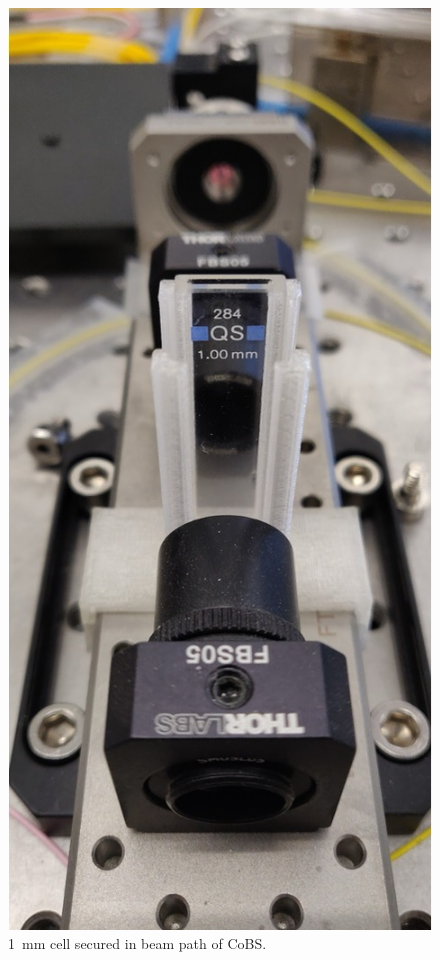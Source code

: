 \begin{figure}[t]
  \centering
  \includegraphics[height=.8\textheight]{figs/4-Raman/1mmCS2.jpg}
  \caption{\SI{1}{\milli\meter}  cell secured in beam path of \acl{CoBS}.}
  \label{fig:Raman:1mmCS2}
\end{figure}

